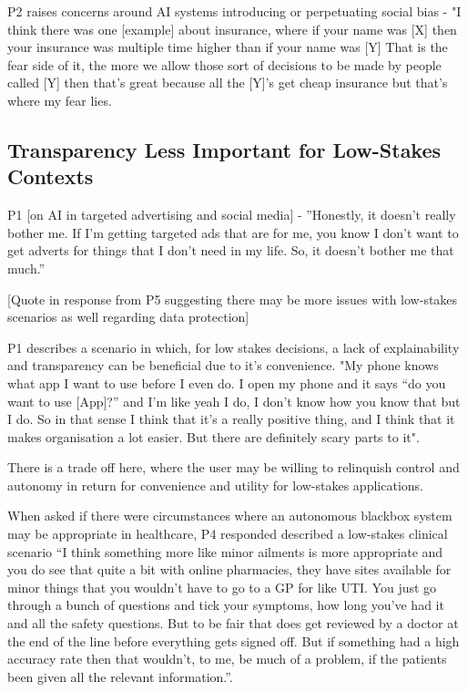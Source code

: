 \documentclass[manuscript,screen,review]{acmart}
\begin{document}
P2 raises concerns around AI systems introducing or perpetuating social bias - "I think there was one [example] about insurance, where if your name was [X] then your insurance was multiple time higher than if your name was [Y] That is the fear side of it, the more we allow those sort of decisions to be made by people called [Y] then that’s great because all the [Y]'s get cheap insurance but that’s where my fear lies.



\subsection{Transparency Less Important for Low-Stakes Contexts}

P1 [on AI in targeted advertising and social media] - ''Honestly, it doesn’t really bother me. If I'm getting targeted ads that are for me, you know I don’t want to get adverts for things that I don’t need in my life. So, it doesn’t bother me that much.''

[Quote in response from P5 suggesting there may be more issues with low-stakes scenarios as well regarding data protection]

P1 describes a scenario in which, for low stakes decisions, a lack of explainability and transparency can be beneficial due to it’s convenience. "My phone knows what app I want to use before I even do. I open my phone and it says “do you want to use [App]?” and I'm like yeah I do, I don’t know how you know that but I do. So in that sense I think that it’s a really positive thing, and I think that it makes organisation a lot easier. But there are definitely scary parts to it". 

There is a trade off here, where the user may be willing to relinquish control and autonomy in return for convenience and utility for low-stakes applications. 

When asked if there were circumstances where an autonomous blackbox system may be appropriate in healthcare, P4 responded described a low-stakes clinical scenario “I think something more like minor ailments is more appropriate and you do see that quite a bit with online pharmacies, they have sites available for minor things that you wouldn’t have to go to a GP for like UTI. You just go through a bunch of questions and tick your symptoms, how long you’ve had it and all the safety questions. But to be fair that does get reviewed by a doctor at the end of the line before everything gets signed off. But if something had a high accuracy rate then that wouldn’t, to me, be much of a problem, if the patients been given all the relevant information.”. 
\end{document}
